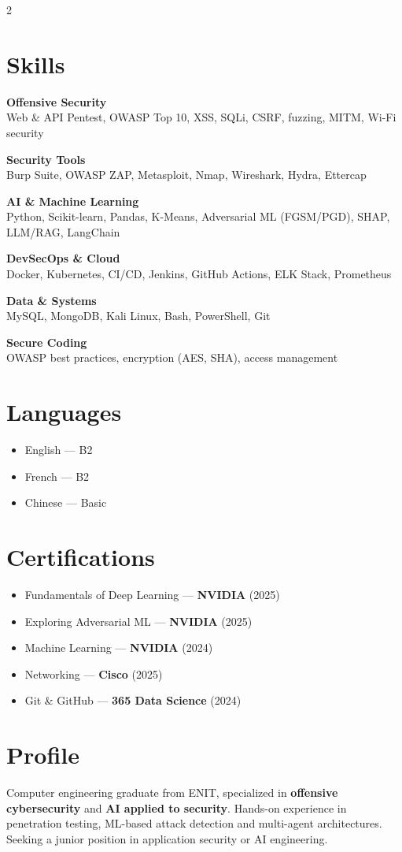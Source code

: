 \documentclass[a4paper,10pt]{article}
\newcommand{\skillcat}[2]{%
  {\bfseries\color{darktext}#1}\\[1pt]{\small\color{graytext}#2}\par\vspace{5pt}}
\begin{document}
\begin{paracol}{2}
\section*{}
\vspace{-14pt}
\section{Skills}
\skillcat{Offensive Security}{Web \& API Pentest, OWASP Top 10, XSS, SQLi, CSRF, fuzzing, MITM, Wi-Fi security}
\skillcat{Security Tools}{Burp Suite, OWASP ZAP, Metasploit, Nmap, Wireshark, Hydra, Ettercap}
\skillcat{AI \& Machine Learning}{Python, Scikit-learn, Pandas, K-Means, Adversarial ML (FGSM/PGD), SHAP, LLM/RAG, LangChain}
\skillcat{DevSecOps \& Cloud}{Docker, Kubernetes, CI/CD, Jenkins, GitHub Actions, ELK Stack, Prometheus}
\skillcat{Data \& Systems}{MySQL, MongoDB, Kali Linux, Bash, PowerShell, Git}
\skillcat{Secure Coding}{OWASP best practices, encryption (AES, SHA), access management}
\section{Languages}
\begin{itemize}
  \item English — B2
  \item French — B2
  \item Chinese — Basic
\end{itemize}
\section{Certifications}
\begin{itemize}
  \item Fundamentals of Deep Learning — \textbf{NVIDIA} (2025)
  \item Exploring Adversarial ML — \textbf{NVIDIA} (2025)
  \item Machine Learning — \textbf{NVIDIA} (2024)
  \item Networking — \textbf{Cisco} (2025)
  \item Git \& GitHub — \textbf{365 Data Science} (2024)
\end{itemize}
\switchcolumn
\section{Profile}
{\small Computer engineering graduate from ENIT, specialized in \textbf{offensive cybersecurity} and \textbf{AI applied to security}. Hands-on experience in penetration testing, ML-based attack detection and multi-agent architectures. Seeking a junior position in application security or AI engineering.}

\end{paracol}
\end{document}
